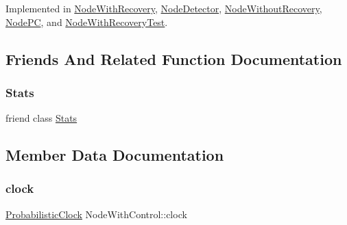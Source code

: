 Implemented in \hyperlink{class_node_with_recovery_aec147b3723b3dab00f9610453ba8daba}{Node\+With\+Recovery}, \hyperlink{class_node_detector_a51e7dccd54e94bbe937752ca39dfdba4}{Node\+Detector}, \hyperlink{class_node_without_recovery_a8cf83ec6d0af26e385dcde0bc03f5b6d}{Node\+Without\+Recovery}, \hyperlink{class_node_p_c_a54731196935596e0c6f094a5a8420134}{Node\+PC}, and \hyperlink{class_node_with_recovery_test_af9b78d0ed4fefb97e2f54c9279aa4655}{Node\+With\+Recovery\+Test}.



\subsection{Friends And Related Function Documentation}
\mbox{\label{class_node_with_control_a129f65b6976377739eb6231b6962985e}} 
\subsubsection{\texorpdfstring{Stats}{Stats}}
{\footnotesize\ttfamily friend class \hyperlink{class_stats}{Stats}\hspace{0.3cm}{\ttfamily [friend]}}



\subsection{Member Data Documentation}
\mbox{\label{class_node_with_control_a051a7d7f2452f1f8da3bc5bfb05a7760}} 
\subsubsection{\texorpdfstring{clock}{clock}}
{\footnotesize\ttfamily \hyperlink{class_probabilistic_clock}{Probabilistic\+Clock} Node\+With\+Control\+::clock\hspace{0.3cm}{\ttfamily [protected]}}

\mbox{\label{class_node_with_control_aed34cc5a5b277c43f10f8cbbbeb59327}} 
